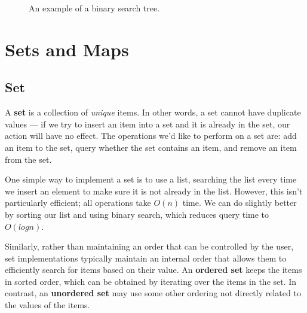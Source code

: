 \begin{figure}
\centering
{}
\caption{An example of a binary search tree.}
\label{fig:tree2}
\end{figure}



\section{Sets and Maps}

\subsection{Set}
A \textbf{set} is a collection of \textit{unique} items. In other words, a set cannot have duplicate values --- if we try to insert an item into a set and it is already in the set, our action will have no effect. The operations we'd like to perform on a set are: add an item to the set, query whether the set contains an item, and remove an item from the set.

One simple way to implement a set is to use a list, searching the list every time we insert an element to make sure it is not already in the list. However, this isn't particularly efficient; all operations take $O(n)$ time. We can do slightly better by sorting our list and using binary search, which reduces query time to $O(log n)$.

Similarly, rather than maintaining an order that can be controlled by the user, set implementations typically maintain an internal order that allows them to efficiently search for items based on their value. An \textbf{ordered set} keeps the items in sorted order, which can be obtained by iterating over the items in the set. In contrast, an \textbf{unordered set} may use some other ordering not directly related to the values of the items.


